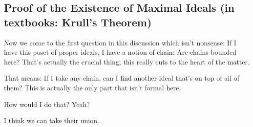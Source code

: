 \begin{content}
\end{content}

\subsection{Proof of the Existence of Maximal Ideals (in textbooks: Krull's Theorem)}

\begin{speech}[00:42:03 - 00:42:52]
Now we come to the first question in this discussion which isn't nonsense: If I have this poset of proper ideals, I have a notion of chain: Are chains bounded here? That's actually the crucial thing; this really cuts to the heart of the matter.

That means: If I take any chain, can I find another ideal that's on top of all of them? This is actually the only part that isn't formal here.

How would I do that? Yeah?
\end{speech}

\begin{student}
I think we can take their union.
\end{student}

